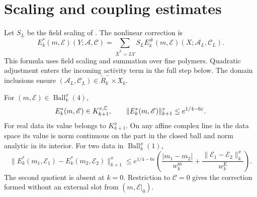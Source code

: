 \section{Scaling and coupling estimates}
\label{subsec:rgnl-scaled-correction}

Let $S_L$ be the field scaling of
. The nonlinear correction is
\begin{equation}\label{eq:rgnl-scaled-correction}
 E_k^*(m,\mathscr E)(Y;\mathscr A,\mathscr C)
  =\sum_{\bar X^L=LY}S_L
        E_k^\#(m,\mathscr E)(X;\mathscr A_L,\mathscr C_L).
\end{equation}
This formula uses field scaling and summation over fine
polymers. Quadratic adjustment enters the incoming
activity term in the full step below.
The domain inclusions
 ensure
$(\mathscr A_L,\mathscr C_L)
\in\widetilde R_k^-\times\mathfrak X_k$.

\begin{proposition}\label{prop:rgnl-scaled-correction}
For $(m,\mathscr E)\in\operatorname{Ball}_k^x(4)$,
\[
 E_k^*(m,\mathscr E)\in K_{k+1}^{x,\mathbb C},\qquad
                  \|E_k^*(m,\mathscr E)\|_{k+1}^x
                                      \le e^{1/4-6\varepsilon}.
\]
For real data its value belongs to $K_{k+1}^x$.
On any affine complex line in the data space its value
is norm continuous on the part in the closed ball and
norm analytic in its interior.
For two data in $\operatorname{Ball}_k^x(1)$,
\begin{equation}\label{eq:rgnl-coupling-Lipschitz}
 \|E_k^*(m_1,\mathscr E_1)-E_k^*(m_2,\mathscr E_2)\|_{k+1}^x
 \le e^{1/4-6\varepsilon}
       \left(\frac{|m_1-m_2|}{w_k^{\mathrm m}}
              +\frac{\|\mathscr E_1-\mathscr E_2\|_k^x}
                                                    {w_k^{\mathrm E}}\right).
\end{equation}
The second quotient is absent at $k=0$.
Restriction to $\mathscr C=0$ gives the correction formed
without an external slot from $(m,\mathscr E|_0)$.
\end{proposition}


